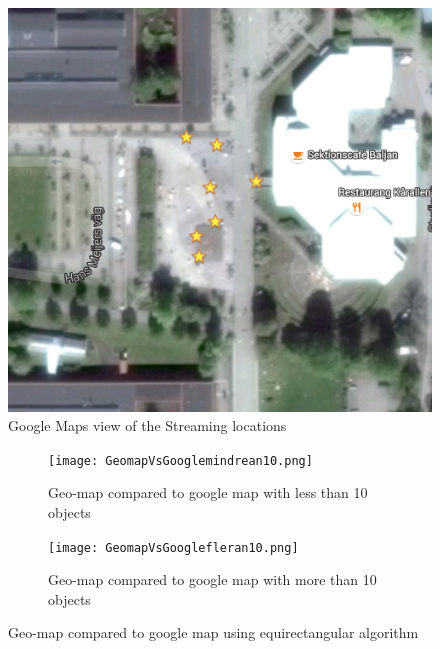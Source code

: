 \begin{figure}[ht!]
\begin{center}
	\includegraphics[scale=0.64]{Google_Maps.png}
	\caption{Google Maps view of the Streaming locations}
	\label{fig:googlemaps}
\end{center}
\end{figure}

\begin{figure}
\begin{subfigure}[b]{0.5\textwidth}
        \texttt{[image: GeomapVsGooglemindrean10.png]}
        \caption{Geo-map compared to google map with less than 10 objects}
        \label{fig:GeomapVsGoogleLessThan10objects}
    \end{subfigure}\hfill 
    \hspace{3px}
    \begin{subfigure}[b]{0.51\textwidth}
        \texttt{[image: GeomapVsGooglefleran10.png]}
        \caption{Geo-map compared to google map with more than 10 objects}
        \label{fig:tiger}
    \label{fig:GeomapVsGoogleMoreThan10objects}
    \end{subfigure}
	\caption{Geo-map compared to google map using equirectangular algorithm}
	\label{fig:GeomapVsGoogleWithLessThan10objects}
\end{figure}

